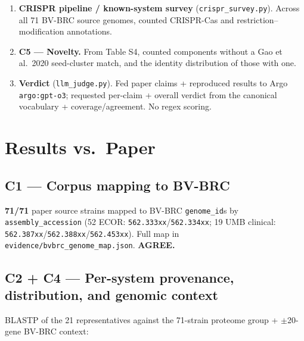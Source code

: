 \documentclass[11pt,letterpaper]{article}
\begin{document}
\begin{enumerate}
\item \textbf{CRISPR pipeline / known-system survey} (\texttt{crispr\_survey.py}). Across all 71 BV-BRC source genomes, counted CRISPR-Cas and restriction--modification annotations.
\item \textbf{C5 --- Novelty.} From Table S4, counted components without a Gao et al.\ 2020 seed-cluster match, and the identity distribution of those with one.
\item \textbf{Verdict} (\texttt{llm\_judge.py}). Fed paper claims + reproduced results to Argo \texttt{argo:gpt-o3}; requested per-claim + overall verdict from the canonical vocabulary + coverage/agreement. No regex scoring.
\end{enumerate}

\section{Results vs.\ Paper}

\subsection{C1 --- Corpus mapping to BV-BRC}
\textbf{71/71} paper source strains mapped to BV-BRC \texttt{genome\_id}s by \texttt{assembly\_accession} (52 ECOR: \texttt{562.333xx}/\texttt{562.334xx}; 19 UMB clinical: \texttt{562.387xx}/\texttt{562.388xx}/\texttt{562.453xx}). Full map in \texttt{evidence/bvbrc\_genome\_map.json}. \textbf{AGREE.}

\subsection{C2 + C4 --- Per-system provenance, distribution, and genomic context}
BLASTP of the 21 representatives against the 71-strain proteome group + $\pm$20-gene BV-BRC context:
\end{document}
